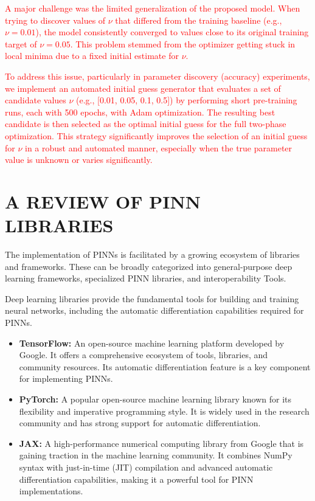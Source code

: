 \documentclass[12pt,fleqn]{article}
\begin{document}
\textcolor{red}{A major challenge was the limited generalization of the proposed model. When trying to discover values of $\nu$ that differed from the training baseline (e.g., $\nu=0.01$), the model consistently converged to values close to its original training target of $\nu=0.05$. This problem stemmed from the optimizer getting stuck in local minima due to a fixed initial estimate for $\nu$.}

\textcolor{red}{To address this issue, particularly in parameter discovery (accuracy) experiments, we implement an automated initial guess generator that evaluates a set of candidate values $\nu$ (e.g., [0.01, 0.05, 0.1, 0.5]) by performing short pre-training runs, each with 500 epochs, with Adam optimization. The resulting best candidate is then selected as the optimal initial guess for the full two-phase optimization. This strategy significantly improves the selection of an initial guess for $\nu$ in a robust and automated manner, especially when the true parameter value is unknown or varies significantly.}










\section{A REVIEW OF PINN LIBRARIES}

The implementation of PINNs is facilitated by a growing ecosystem of libraries and frameworks. These can be broadly categorized into general-purpose deep learning frameworks, specialized PINN libraries, and interoperability Tools.


Deep learning libraries provide the fundamental tools for building and training neural networks, including the automatic differentiation capabilities required for PINNs.

\begin{itemize}
\item \textbf{TensorFlow:} An open-source machine learning platform developed by Google. It offers a comprehensive ecosystem of tools, libraries, and community resources. Its automatic differentiation feature is a key component for implementing PINNs.
\item \textbf{PyTorch:} A popular open-source machine learning library known for its flexibility and imperative programming style. It is widely used in the research community and has strong support for automatic differentiation.
\item \textbf{JAX:} A high-performance numerical computing library from Google that is gaining traction in the machine learning community. It combines NumPy syntax with just-in-time (JIT) compilation and advanced automatic differentiation capabilities, making it a powerful tool for PINN implementations.
\end{itemize}
\end{document}
